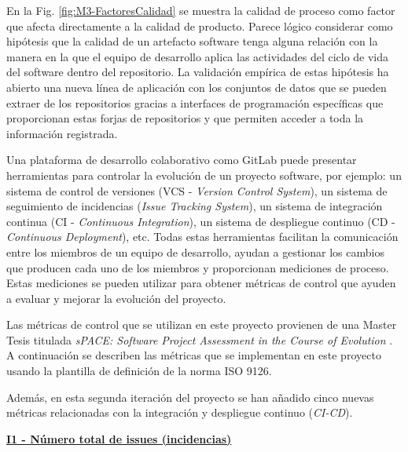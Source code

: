 En la Fig. \ref{fig:M3-FactoresCalidad} se muestra la calidad de proceso como factor que afecta directamente a la calidad de producto. Parece lógico considerar como hipótesis que la calidad de un artefacto software tenga alguna relación con la manera en la que el equipo de desarrollo aplica las actividades del ciclo de vida del software dentro del repositorio. La validación empírica de estas  hipótesis ha abierto una nueva línea de aplicación con los conjuntos de datos que se pueden extraer de los repositorios gracias a interfaces de programación específicas que proporcionan estas forjas de repositorios y que permiten acceder a toda la información registrada.

Una plataforma de desarrollo colaborativo como GitLab puede presentar herramientas para controlar la evolución de un proyecto software, por ejemplo: un sistema de control de versiones (VCS - \textit{Version Control System}), un sistema de seguimiento de incidencias (\textit{Issue Tracking System}), un sistema de integración continua (CI - \textit{Continuous Integration}), un sistema de despliegue continuo (CD - \textit{Continuous Deployment}), etc.
Todas estas herramientas facilitan la comunicación entre los miembros de un equipo de desarrollo, ayudan a gestionar los cambios que producen cada uno de los miembros y proporcionan mediciones de proceso. Estas mediciones se pueden utilizar para obtener métricas de control que ayuden a evaluar y mejorar la evolución del proyecto.

Las métricas de control que se utilizan en este proyecto provienen de una Master Tesis titulada \textit{sPACE: Software Project Assessment in the Course of Evolution} \cite{ratzinger_space:_2007}. 
A continuación se describen las métricas que se implementan en este proyecto usando la plantilla de definición de la norma ISO 9126.

Además, en esta segunda iteración del proyecto se han añadido cinco nuevas métricas relacionadas con la integración y despliegue continuo (\textit{CI-CD}).

 
\textbf{\underline{I1 - Número total de issues (incidencias)}}

